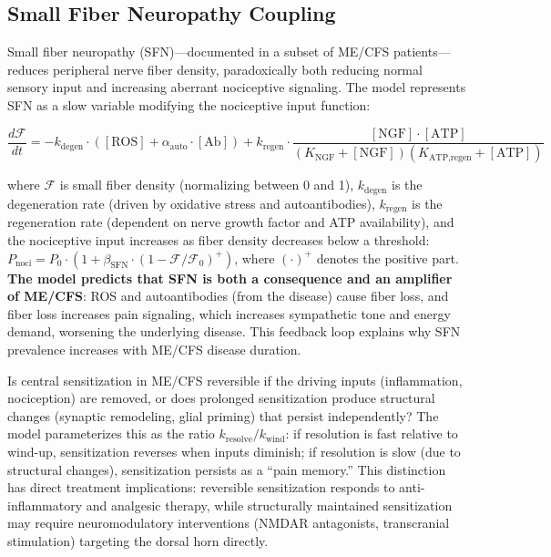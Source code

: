 \subsection{Small Fiber Neuropathy Coupling}

Small fiber neuropathy (SFN)---documented in a subset of ME/CFS patients---reduces peripheral nerve fiber density, paradoxically both reducing normal sensory input and increasing aberrant nociceptive signaling. The model represents SFN as a slow variable modifying the nociceptive input function:

\begin{equation}
\label{eq:sfn-dynamics}
\frac{d\mathcal{F}}{dt} = -k_{\text{degen}} \cdot ([\text{ROS}] + \alpha_{\text{auto}} \cdot [\text{Ab}]) + k_{\text{regen}} \cdot \frac{[\text{NGF}] \cdot [\text{ATP}]}{(K_{\text{NGF}} + [\text{NGF}])(K_{\text{ATP,regen}} + [\text{ATP}])}
\end{equation}

where $\mathcal{F}$ is small fiber density (normalizing between 0 and 1), $k_{\text{degen}}$ is the degeneration rate (driven by oxidative stress and autoantibodies), $k_{\text{regen}}$ is the regeneration rate (dependent on nerve growth factor and ATP availability), and the nociceptive input increases as fiber density decreases below a threshold: $P_{\text{noci}} = P_0 \cdot (1 + \beta_{\text{SFN}} \cdot (1 - \mathcal{F}/\mathcal{F}_0)^+)$, where $(\cdot)^+$ denotes the positive part. \textbf{The model predicts that SFN is both a consequence and an amplifier of ME/CFS}: ROS and autoantibodies (from the disease) cause fiber loss, and fiber loss increases pain signaling, which increases sympathetic tone and energy demand, worsening the underlying disease. This feedback loop explains why SFN prevalence increases with ME/CFS disease duration.

\begin{open_question}
Is central sensitization in ME/CFS reversible if the driving inputs (inflammation, nociception) are removed, or does prolonged sensitization produce structural changes (synaptic remodeling, glial priming) that persist independently? The model parameterizes this as the ratio $k_{\text{resolve}} / k_{\text{wind}}$: if resolution is fast relative to wind-up, sensitization reverses when inputs diminish; if resolution is slow (due to structural changes), sensitization persists as a ``pain memory.'' This distinction has direct treatment implications: reversible sensitization responds to anti-inflammatory and analgesic therapy, while structurally maintained sensitization may require neuromodulatory interventions (NMDAR antagonists, transcranial stimulation) targeting the dorsal horn directly.
\end{open_question}

